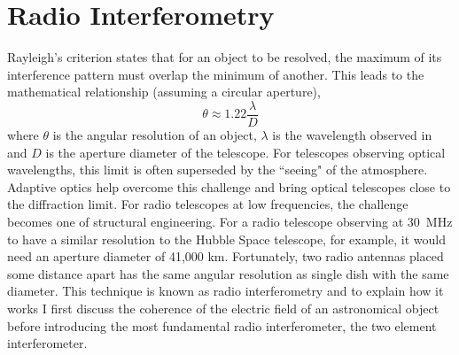 %
%

\section{Radio Interferometry}
\label{sec:interferometry}
Rayleigh's criterion states that for an object to be resolved, the maximum of its interference pattern must overlap the minimum of another. This leads to the mathematical relationship (assuming a circular aperture), 
$$\theta \approx 1.22 \frac{\lambda}{D}$$ 
where $\theta$ is the angular resolution of an object, $\lambda$ is the wavelength observed in and $D$ is the aperture diameter of the telescope. For telescopes observing optical wavelengths, this limit is often superseded by the ``seeing" of the atmosphere. Adaptive optics help overcome this challenge and bring optical telescopes close to the diffraction limit. For radio telescopes at low frequencies, the challenge becomes one of structural engineering. For a radio telescope observing at 30~MHz to have a similar resolution to the Hubble Space telescope, for example, it would need an aperture diameter of 41,000 km. Fortunately, two radio antennas placed some distance apart has the same angular resolution as single dish with the same diameter. This technique is known as radio interferometry and to explain how it works I first discuss the coherence of the electric field of an astronomical object before introducing the most fundamental radio interferometer, the two element interferometer.

